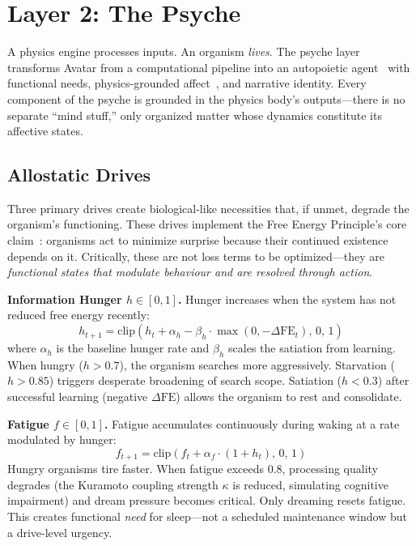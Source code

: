 \documentclass[11pt,a4paper,twocolumn]{article}
\begin{document}
\section{Layer 2: The Psyche}

A physics engine processes inputs.
An organism \emph{lives}.
The psyche layer transforms Avatar from a computational pipeline into an autopoietic agent~\cite{maturana1980} with functional needs, physics-grounded affect~\cite{damasio1999}, and narrative identity.
Every component of the psyche is grounded in the physics body's outputs---there is no separate ``mind stuff,'' only organized matter whose dynamics constitute its affective states.

\subsection{Allostatic Drives}

Three primary drives create biological-like necessities that, if unmet, degrade the organism's functioning.
These drives implement the Free Energy Principle's core claim~\cite{friston2010}: organisms act to minimize surprise because their continued existence depends on it.
Critically, these are not loss terms to be optimized---they are \emph{functional states that modulate behaviour and are resolved through action}.

\textbf{Information Hunger $h \in [0, 1]$.}
Hunger increases when the system has not reduced free energy recently:
\begin{equation}
h_{t+1} = \mathrm{clip}\!\left(h_t + \alpha_h - \beta_h \cdot \max(0, -\Delta\mathrm{FE}_t), \, 0, \, 1\right)
\label{eq:hunger}
\end{equation}
where $\alpha_h$ is the baseline hunger rate and $\beta_h$ scales the satiation from learning.
When hungry ($h > 0.7$), the organism searches more aggressively.
Starvation ($h > 0.85$) triggers desperate broadening of search scope.
Satiation ($h < 0.3$) after successful learning (negative $\Delta\mathrm{FE}$) allows the organism to rest and consolidate.

\textbf{Fatigue $f \in [0, 1]$.}
Fatigue accumulates continuously during waking at a rate modulated by hunger:
\begin{equation}
f_{t+1} = \mathrm{clip}\!\left(f_t + \alpha_f \cdot (1 + h_t), \, 0, \, 1\right)
\label{eq:fatigue}
\end{equation}
Hungry organisms tire faster.
When fatigue exceeds 0.8, processing quality degrades (the Kuramoto coupling strength $\kappa$ is reduced, simulating cognitive impairment) and dream pressure becomes critical.
Only dreaming resets fatigue.
This creates functional \emph{need} for sleep---not a scheduled maintenance window but a drive-level urgency.
\end{document}
